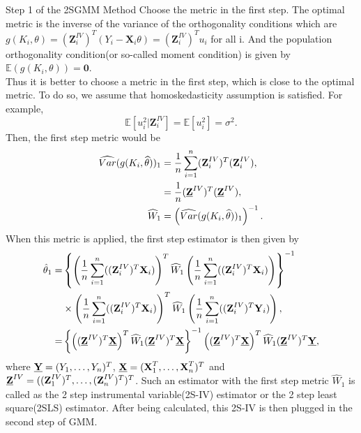 \documentclass{article}
\theoremstyle{definition}
\begin{document}
\begin{itembox}[1]{{\color{blue} Step 1 of the 2SGMM Method}}
Choose the metric in the first step. The optimal metric is the inverse of the variance of the orthogonality conditions which are $g(K_i, \theta) = (\textbf{Z}_{i}^{IV})^T (Y_i - \textbf{X}_i\theta) = (\textbf{Z}_{i}^{IV})^T u_i$ for all i. And the population orthogonality condition(or so-called moment condition) is given by $\mathbb{E}\left(g(K_i, \theta)\right) = \textbf{0}$.\\
Thus it is better to choose a metric in the first step, which is close to the optimal metric. To do so, we assume that homoskedasticity assumption is satisfied. For example,\\
\begin{equation*}
	\mathbb{E}[u_i^2 | \textbf{Z}_{i}^{IV}] = \mathbb{E}[u_i^2] = \sigma^2.
\end{equation*}
Then, the first step metric would be\\
\begin{align*}
	\widehat{Var}(g(K_i, \widehat{\theta}))_1 
	& = \frac{1}{n}\sum_{i=1}^{n}(\textbf{Z}_{i}^{IV})^T (\textbf{Z}_{i}^{IV}),\\
	& = \frac{1}{n} (\textbf{\underline{Z}}^{IV})^T (\textbf{\underline{Z}}^{IV}),\\
	\widehat{W}_1 & = \left(\widehat{Var}(g(K_i, \widehat{\theta}))_1 \right)^{-1}.
\end{align*}
When this metric is applied, the first step estimator is then given by\\
\begin{align*}
	\hat{\theta}_1  = & \left\{
	\left(\frac{1}{n}\sum_{i=1}^{n}((\textbf{Z}_{i}^{IV})^T \textbf{X}_{i}) \right)^T \widehat{W}_1 \left(\frac{1}{n}\sum_{i=1}^{n}((\textbf{Z}_{i}^{IV})^T \textbf{X}_{i}) \right) \right\}^{-1}\\
	& \times\left(\frac{1}{n}\sum_{i=1}^{n}((\textbf{Z}_{i}^{IV})^T \textbf{X}_{i}) \right)^T \widehat{W}_1 \left(\frac{1}{n}\sum_{i=1}^{n}((\textbf{Z}_{i}^{IV})^T \textbf{Y}_{i}) \right),\\
	= & \left\{\left((\textbf{\underline{Z}}^{IV})^T \textbf{\underline{X}} \right)^T \widehat{W}_1 (\textbf{\underline{Z}}^{IV})^T \textbf{\underline{X}} \right\}^{-1} \left((\textbf{\underline{Z}}^{IV})^T \textbf{\underline{X}} \right)^T \widehat{W}_1 (\textbf{\underline{Z}}^{IV})^T \textbf{\underline{Y}},
\end{align*}
where $\textbf{\underline{Y}} = (Y_1, \dots, Y_n)^T$, $\textbf{\underline{X}} = (\textbf{X}_{1}^T, \dots, \textbf{X}_{n}^T)^T$ and $\textbf{\underline{Z}}^{IV} = ((\textbf{Z}_{1}^{IV})^T, \dots, (\textbf{Z}_{n}^{IV})^T)^T$. Such an estimator with the first step metric $\widehat{W}_1$ is called as the {\color{blue}2 step instrumental variable}(2S-IV) estimator or the {\color{blue}2 step least square}(2SLS) estimator. After being calculated, this 2S-IV is then plugged in the second step of GMM. \\

\end{itembox}
\end{document}

